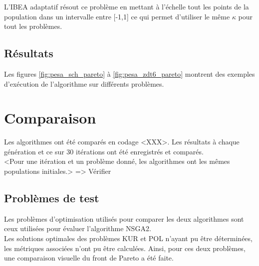 \documentclass[12pt, letterpaper]{article}
\begin{document}
L'IBEA adaptatif résout ce problème en mettant à l'échelle tout les points de la population dans un intervalle entre [-1,1] ce qui
permet d'utiliser le même $\kappa$ pour tout les problèmes.

\subsection{Résultats}
Les figures \ref{fig:pesa_sch_pareto} à \ref{fig:pesa_zdt6_pareto}
montrent des exemples d'exécution de l'algorithme sur différents
problèmes.


\section{Comparaison}

Les algorithmes ont été comparés en codage <XXX>. Les résultats à
chaque génération et ce sur 30 itérations ont été enregistrés et
comparés.\\
<Pour une itération et un problème donné, les algorithmes ont les mêmes
populations initiales.> => Vérifier

\subsection{Problèmes de test}
Les problèmes d'optimisation utilisés pour comparer les deux
algorithmes sont ceux utilisées pour évaluer l'algorithme NSGA2.\\
Les solutions optimales des problèmes KUR et POL n'ayant pu être
déterminées, les métriques associées n'ont pu être calculées. Ainsi,
pour ces deux problèmes, une comparaison visuelle du front de Pareto a
été faite.\\
\end{document}
